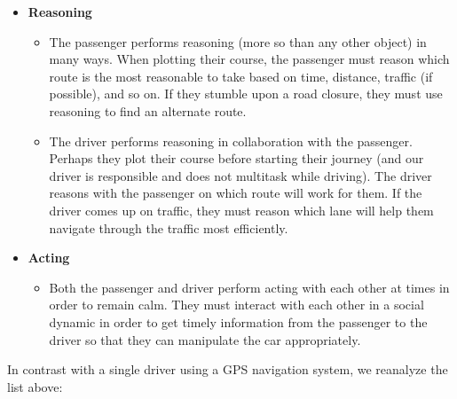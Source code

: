 \begin{itemize}
\begin{itemize}
  \end{itemize}
\item
  \textbf{Reasoning}
  \begin{itemize}
  \item
    The passenger performs reasoning (more so than any other object) in many ways. When plotting their course, the passenger must reason which route is the most reasonable to take based on time, distance, traffic (if possible), and so on. If they stumble upon a road closure, they must use reasoning to find an alternate route.
  \item
    The driver performs reasoning in collaboration with the passenger. Perhaps they plot their course before starting their journey (and our driver is responsible and does not multitask while driving). The driver reasons with the passenger on which route will work for them. If the driver comes up on traffic, they must reason which lane will help them navigate through the traffic most efficiently.
  \end{itemize}
\item
  \textbf{Acting}
  \begin{itemize}
  \item
    Both the passenger and driver perform acting with each other at times in order to remain calm. They must interact with each other in a social dynamic in order to get timely information from the passenger to the driver so that they can manipulate the car appropriately.
  \end{itemize}
\end{itemize}

In contrast with a single driver using a GPS navigation system, we reanalyze the list above:

